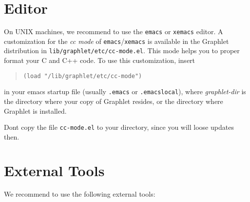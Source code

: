 %
%

\section{Editor}

On UNIX machines, we recommend to use the \texttt{emacs} or
\texttt{xemacs} editor.  A customization for the \emph{cc mode}
of \texttt{emacs}/\texttt{xemacs} is available in the Graphlet
distribution in \texttt{lib/graphlet/etc/cc-mode.el}. This mode
helps you to proper format your C and C++ code.  To use this
customization, insert

\begin{quote}
  \texttt{(load "/lib/graphlet/etc/cc-mode")}
\end{quote}

\noindent in your emacs startup file (usually \texttt{.emacs} or 
\texttt{.emacslocal}), where \emph{graphlet-dir} is the directory
where your copy of Graphlet resides, or the directory where
Graphlet is installed.

\begin{note}
  Dont copy the file \texttt{cc-mode.el} to your directory, since
  you will loose updates then.
\end{note}


%
%

\section{External Tools}

We recommend to use the following external tools:

